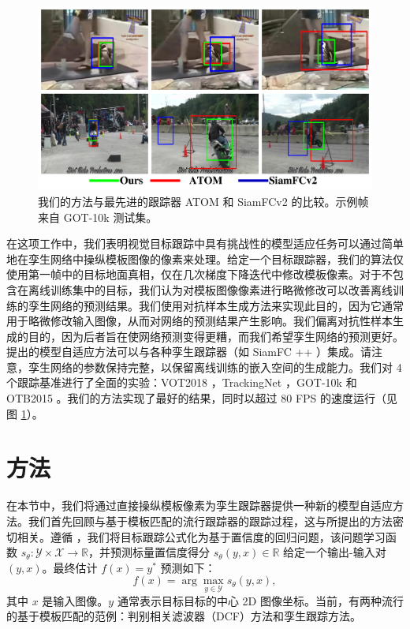 \begin{figure}[t]
    \centering
    \includegraphics[width=1.0\textwidth]{Img/MTP/got10k/visulization2.pdf}
    \caption{我们的方法与最先进的跟踪器 ATOM \cite{danelljan2019atom} 和 SiamFCv2 \cite{SiamFC} 的比较。示例帧来自 GOT-10k \cite{GOT-10k} 测试集。}
    \label{fig:vis}
\end{figure}

在这项工作中，我们表明视觉目标跟踪中具有挑战性的模型适应任务可以通过简单地在孪生网络中操纵模板图像的像素来处理。给定一个目标跟踪器，我们的算法仅使用第一帧中的目标地面真相，仅在几次梯度下降迭代中修改模板像素。对于不包含在离线训练集中的目标，我们认为对模板图像像素进行略微修改可以改善离线训练的孪生网络的预测结果。我们使用对抗样本生成方法来实现此目的，因为它通常用于略微修改输入图像，从而对网络的预测结果产生影响。我们偏离对抗性样本生成的目的，因为后者旨在使网络预测变得更糟，而我们希望孪生网络的预测更好。提出的模型自适应方法可以与各种孪生跟踪器（如 SiamFC ++ \cite{SiamFC++}）集成。请注意，孪生网络的参数保持完整，以保留离线训练的嵌入空间的生成能力。我们对 4 个跟踪基准进行了全面的实验：VOT2018 \cite{kristan2018sixth}，TrackingNet \cite{muller2018trackingnet}，GOT-10k \cite{GOT-10k} 和 OTB2015 \cite{OTB}。我们的方法实现了最好的结果，同时以超过 80 FPS 的速度运行（见图 \ref{fig:vis}）。

\section{方法}
在本节中，我们将通过直接操纵模板像素为孪生跟踪器提供一种新的模型自适应方法。我们首先回顾与基于模板匹配的流行跟踪器的跟踪过程，这与所提出的方法密切相关。遵循 \cite{Danelljan_2020_CVPR}，我们将目标跟踪公式化为基于置信度的回归问题，该问题学习函数 $s_\theta:\mathcal{Y\times X\rightarrow \mathbb R}$，并预测标量置信度得分 $s_\theta(y,x)\in\mathbb R$ 给定一个输出-输入对 $(y,x)$。最终估计 $f(x)=y^*$ 预测如下：
\begin{equation}
    f(x) = \arg\max_{y\in \mathcal Y}s_\theta (y,x),
\end{equation}
其中 $x$ 是输入图像。$y$ 通常表示目标目标的中心 2D 图像坐标。当前，有两种流行的基于模板匹配的范例：判别相关滤波器（DCF）方法和孪生跟踪方法。

